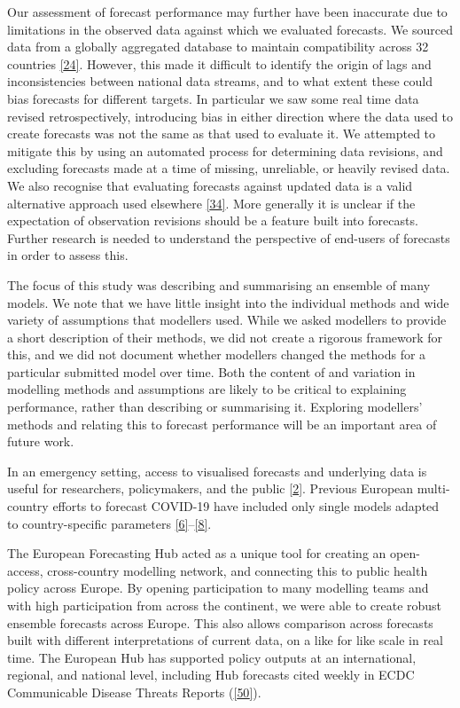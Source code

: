\documentclass[
]{article}
\begin{document}
Our assessment of forecast performance may further have been inaccurate due to limitations in the observed data against which we evaluated forecasts. We sourced data from a globally aggregated database to maintain compatibility across 32 countries \protect\hyperlink{ref-dongInteractiveWebbasedDashboard2020}{{[}24{]}}. However, this made it difficult to identify the origin of lags and inconsistencies between national data streams, and to what extent these could bias forecasts for different targets. In particular we saw some real time data revised retrospectively, introducing bias in either direction where the data used to create forecasts was not the same as that used to evaluate it. We attempted to mitigate this by using an automated process for determining data revisions, and excluding forecasts made at a time of missing, unreliable, or heavily revised data. We also recognise that evaluating forecasts against updated data is a valid alternative approach used elsewhere \protect\hyperlink{ref-cramerEvaluationIndividualEnsemble2021}{{[}34{]}}. More generally it is unclear if the expectation of observation revisions should be a feature built into forecasts. Further research is needed to understand the perspective of end-users of forecasts in order to assess this.

The focus of this study was describing and summarising an ensemble of many models. We note that we have little insight into the individual methods and wide variety of assumptions that modellers used. While we asked modellers to provide a short description of their methods, we did not create a rigorous framework for this, and we did not document whether modellers changed the methods for a particular submitted model over time. Both the content of and variation in modelling methods and assumptions are likely to be critical to explaining performance, rather than describing or summarising it. Exploring modellers' methods and relating this to forecast performance will be an important area of future work.

In an emergency setting, access to visualised forecasts and underlying data is useful for researchers, policymakers, and the public \protect\hyperlink{ref-cdcCoronavirusDisease20192020}{{[}2{]}}. Previous European multi-country efforts to forecast COVID-19 have included only single models adapted to country-specific parameters \protect\hyperlink{ref-aguasModellingCOVID19Pandemic2020}{{[}6{]}}--\protect\hyperlink{ref-agostoMonitoringCOVID19Contagion2021}{{[}8{]}}.

The European Forecasting Hub acted as a unique tool for creating an open-access, cross-country modelling network, and connecting this to public health policy across Europe. By opening participation to many modelling teams and with high participation from across the continent, we were able to create robust ensemble forecasts across Europe. This also allows comparison across forecasts built with different interpretations of current data, on a like for like scale in real time. The European Hub has supported policy outputs at an international, regional, and national level, including Hub forecasts cited weekly in ECDC Communicable Disease Threats Reports (\protect\hyperlink{ref-europeancentrefordiseasepreventionandcontrolWeeklyThreatsReports}{{[}50{]}}).
\end{document}
